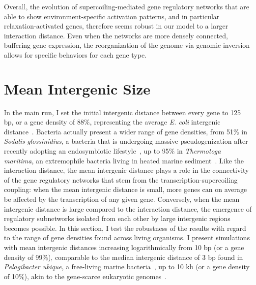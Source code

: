 Overall, the evolution of supercoiling-mediated gene regulatory networks that are able to show environment-specific activation patterns, and in particular relaxation-activated genes, therefore seems robust in our model to a larger interaction distance.
Even when the networks are more densely connected, buffering gene expression, the reorganization of the genome via genomic inversion allows for specific behaviors for each gene type.


\section{Mean Intergenic Size}
\label{sec:param:mean-intergene}

In the main run, I set the initial intergenic distance between every gene to 125 bp, or a gene density of 88\%, representing the average \emph{E. coli} intergenic distance~\citep{postow2004}.
Bacteria actually present a wider range of gene densities, from 51\% in \emph{Sodalis glossinidius}, a bacteria that is undergoing massive pseudogenization after recently adopting an endosymbiotic lifestyle~\citep{toh2006}, up to 95\% in \emph{Thermotoga maritima}, an extremophile bacteria living in heated marine sediment~\citep{nelson1999}.
Like the interaction distance, the mean intergenic distance plays a role in the connectivity of the gene regulatory networks that stem from the transcription-supercoiling coupling: when the mean intergenic distance is small, more genes can on average be affected by the transcription of any given gene.
Conversely, when the mean intergenic distance is large compared to the interaction distance, the emergence of regulatory subnetworks isolated from each other by large intergenic regions becomes possible.
In this section, I test the robustness of the results with regard to the range of gene densities found across living organisms.
I present simulations with mean intergenic distances increasing logarithmically from 10 bp (or a gene density of 99\%), comparable to the median intergenic distance of 3 bp found in \emph{Pelagibacter ubique}, a free-living marine bacteria~\citep{giovannoni2005}, up to 10 kb (or a gene density of 10\%), akin to the gene-scarce eukaryotic genomes~\citep{davilalopez2010}.

